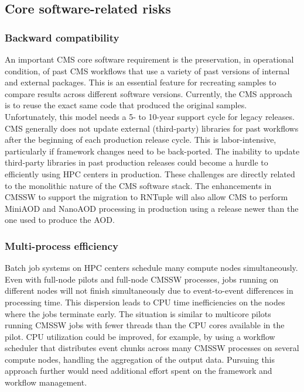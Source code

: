 \subsection{Core software-related risks}

\subsubsection{Backward compatibility}

An important CMS core software requirement is the preservation, in operational condition, of past CMS workflows that use a variety of past versions of internal and external packages. This is an essential feature for recreating samples to compare results across different software versions. Currently, the CMS approach is to reuse the exact same code that produced the original samples. 
Unfortunately, this model needs a 5- to 10-year support cycle for legacy releases. CMS generally does not update external (third-party) libraries for past workflows after the beginning of each production release cycle. This is labor-intensive, particularly if framework changes need to be back-ported. The inability to update third-party libraries in past production releases could become a hurdle to efficiently using \gls{HPC} centers in production. These challenges are directly related to the monolithic nature of the CMS software stack. The enhancements in \gls{CMSSW} to support the migration to RNTuple will also allow CMS to perform MiniAOD and NanoAOD processing in production using a release newer than the one used to produce the \gls{AOD}. 

\subsubsection{Multi-process efficiency}

Batch job systems on \gls{HPC} centers schedule many compute nodes simultaneously. Even with full-node pilots and full-node \gls{CMSSW} processes, jobs running on different nodes will not finish simultaneously due to event-to-event differences in processing time. This dispersion leads to \gls{CPU} time inefficiencies on the nodes where the jobs terminate early. The situation is similar to multicore pilots running \gls{CMSSW} jobs with fewer threads than the \gls{CPU} cores available in the pilot. \gls{CPU} utilization could be improved, for example, by using a workflow scheduler that distributes event chunks across many \gls{CMSSW} processes on several compute nodes, handling the aggregation of the output data. Pursuing this approach further would need additional effort spent on the framework and workflow management.

